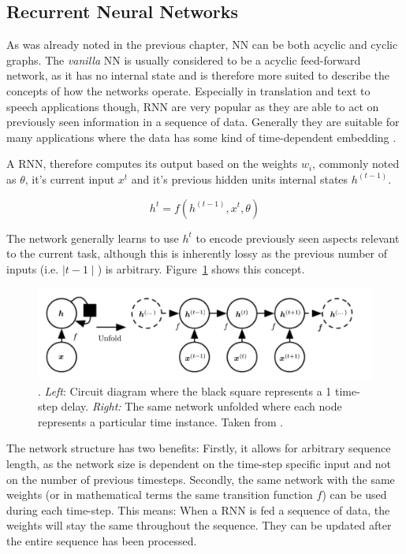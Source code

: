 \subsection{Recurrent Neural Networks}%
\label{sec:recurrent_neural_networks}

As was already noted in the previous chapter, \ac {NN} can be both acyclic and cyclic graphs. The
\emph{vanilla} \ac {NN} is usually considered to be a acyclic feed-forward network, as it has no internal state and is
therefore more suited to describe the concepts of how the networks operate. Especially in translation and text to speech
applications though, \ac {RNN} are very popular as they are able to act on previously seen information in a sequence of
data. Generally they are suitable for many applications where the data has some kind of time-dependent embedding
\cite[p.373]{Goodfellow-et-al-2016}.

A \ac {RNN}, therefore computes its output based on the weights $w_i$, commonly noted as $\theta$, it's current input
$x^t$ and it's previous hidden units internal states $h^(t-1)$.

\[
    h^t = f(h^(t-1), x^t, \theta)
\]

The network generally learns to use $h^t$ to encode previously seen aspects relevant to the current task, although this
is inherently lossy as the previous number of inputs (i.e. $\mid t-1\mid$) is arbitrary. Figure~\ref{fig:rnn_concept}
shows this concept.

\begin{figure}[]
    \centering
    \includegraphics[width=0.8\linewidth]{img/rnn_concept.png}
    \caption[Recurrent Neural Network conceptualized]{. \emph{Left}: Circuit diagram where the black square represents a
    1 time-step delay. \emph{Right:} The same network unfolded where each node represents a particular time instance.
    Taken from \citet{Goodfellow-et-al-2016}.}
    \label{fig:rnn_concept}
\end{figure}

The network structure has two benefits: Firstly, it allows for arbitrary sequence length, as the network size is
dependent on the time-step specific input and not on the number of previous timesteps. Secondly, the same network with
the same weights (or in mathematical terms the same transition function $f$) can be used during each time-step. This
means: When a \ac {RNN} is fed a sequence of data, the weights will stay the same throughout the sequence. They can be
updated after the entire sequence has been processed. 

